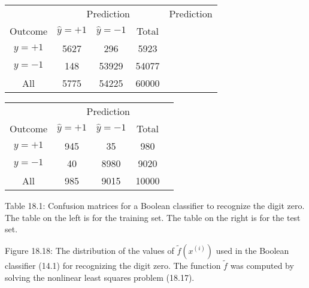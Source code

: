 
\begin{table}
\begin{tabular}{c c c c c c} \hline \hline  & \multicolumn{3}{c}{Prediction} & \multicolumn{3}{c}{Prediction} \\ \cline{2-5} Outcome & \(\hat{y}=+1\) & \(\hat{y}=-1\) & Total \\ \hline \(y=+1\) & 5627 & 296 & 5923 \\ \(y=-1\) & 148 & 53929 & 54077 \\ All & 5775 & 54225 & 60000 \\ \hline \hline \end{tabular} 
\begin{tabular}{c c c c c} \hline \hline  & \multicolumn{3}{c}{Prediction} \\ \cline{2-5} Outcome & \(\hat{y}=+1\) & \(\hat{y}=-1\) & Total \\ \hline \(y=+1\) & 945 & 35 & 980 \\ \(y=-1\) & 40 & 8980 & 9020 \\ All & 985 & 9015 & 10000 \\ \hline \hline \end{tabular}
\end{table}
Table 18.1: Confusion matrices for a Boolean classifier to recognize the digit zero. The table on the left is for the training set. The table on the right is for the test set.

Figure 18.18: The distribution of the values of \(\tilde{f}(x^{(i)})\) used in the Boolean classifier (14.1) for recognizing the digit zero. The function \(\tilde{f}\) was computed by solving the nonlinear least squares problem (18.17).

 
